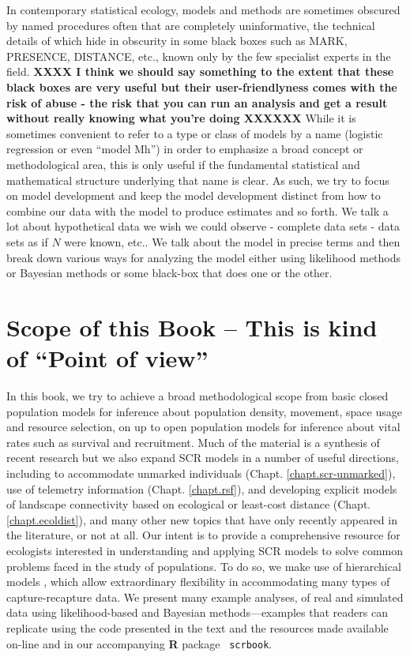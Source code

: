 In contemporary statistical ecology, models and methods are sometimes
obscured by named procedures often that are completely uninformative,
the technical details of which hide in obscurity in some black boxes
such as MARK, PRESENCE, DISTANCE, etc., known only by the few
specialist experts in the field.  {\bf XXXX I think we should say
  something to the extent that these black boxes are very useful but
  their user-friendlyness comes with the risk of abuse - the risk that
  you can run an analysis and get a result without really knowing what
  you're doing XXXXXX}  While it is sometimes convenient to refer to a
type or class of models by a name (logistic regression or even ``model
Mh'') in order to emphasize a broad concept or methodological area,
this is only useful if the fundamental statistical and mathematical
structure underlying that name is clear. As such, we try to focus on
model development and keep the model development distinct from how to
combine our data with the model to produce estimates and so forth. We
talk a lot about hypothetical data we wish we could observe - complete
data sets - data sets as if $N$ were known, etc.. We talk about the
model in precise terms and then break down various ways for analyzing
the model either using likelihood methods or Bayesian methods or some
black-box that does one or the other.



\section{Scope of this Book  
-- This is kind of ``Point of view''}

In this book, we try to achieve a broad methodological scope from
basic closed population models %
for inference about population density, movement, space usage and resource
selection, on up to open population models for inference about vital
rates such as survival and recruitment. %
Much of the material is a synthesis of recent research but we also
expand SCR models in a number of useful directions, including to
accommodate unmarked individuals (Chapt. \ref{chapt.scr-unmarked}),
use of telemetry information (Chapt. \ref{chapt.rsf}), and developing
explicit models of landscape connectivity based on ecological or
least-cost distance (Chapt. \ref{chapt.ecoldist}), and many other new
topics that have only recently appeared in the literature, or not at all.  Our intent
is to provide a comprehensive resource for ecologists interested in
understanding and applying SCR models to solve common problems faced
in the study of populations.  To do so, we make use of hierarchical
models \citep{royle_dorazio:2008}, which allow extraordinary
flexibility in accommodating many types of capture-recapture data. We
present many example analyses, of real and simulated data using
likelihood-based and Bayesian methods---examples that readers can
replicate using the code presented in the text and the resources made
available on-line and in our accompanying {\bf R} package {\tt
  scrbook}.

